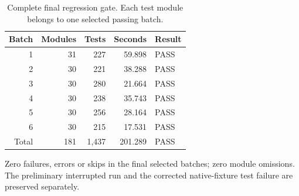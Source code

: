 \begin{table}[tbp]
\centering
\small
\setlength{\tabcolsep}{4pt}
\caption{Complete final regression gate. Each test module belongs to one selected passing batch.}
\label{tab:regression}
\begin{tabular}{@{}rrrrl@{}}
\toprule
Batch & Modules & Tests & Seconds & Result\\
\midrule
1 & 31 & 227 & 59.898 & PASS\\
2 & 30 & 221 & 38.288 & PASS\\
3 & 30 & 280 & 21.664 & PASS\\
4 & 30 & 238 & 35.743 & PASS\\
5 & 30 & 256 & 28.164 & PASS\\
6 & 30 & 215 & 17.531 & PASS\\
\midrule Total & 181 & 1,437 & 201.289 & PASS\\
\bottomrule
\end{tabular}
\par\smallskip
\begin{minipage}{0.97\textwidth}
\footnotesize Zero failures, errors or skips in the final selected batches; zero module omissions. The preliminary interrupted run and the corrected native-fixture test failure are preserved separately.
\end{minipage}
\end{table}
